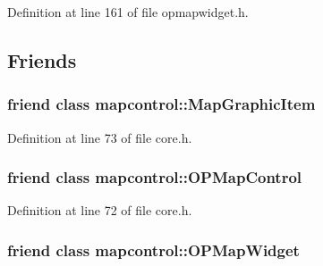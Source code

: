 \-Definition at line 161 of file opmapwidget.\-h.



\subsection{\-Friends}
\hypertarget{group___o_p_map_widget_ga4fb537bcd209fc77cf5b8c9e38360c07}{
\subsubsection[{mapcontrol\-::\-Map\-Graphic\-Item}]{\setlength{\rightskip}{0pt plus 5cm}friend class {\bf mapcontrol\-::\-Map\-Graphic\-Item}}}\label{group___o_p_map_widget_ga4fb537bcd209fc77cf5b8c9e38360c07}


\-Definition at line 73 of file core.\-h.

\hypertarget{group___o_p_map_widget_ga88abf786b489e97fc16ff6c07da3626e}{
\subsubsection[{mapcontrol\-::\-O\-P\-Map\-Control}]{\setlength{\rightskip}{0pt plus 5cm}friend class mapcontrol\-::\-O\-P\-Map\-Control}}\label{group___o_p_map_widget_ga88abf786b489e97fc16ff6c07da3626e}


\-Definition at line 72 of file core.\-h.

\hypertarget{group___o_p_map_widget_gaab6f3be35d4d41ee35530f402954d903}{
\subsubsection[{mapcontrol\-::\-O\-P\-Map\-Widget}]{\setlength{\rightskip}{0pt plus 5cm}friend class {\bf mapcontrol\-::\-O\-P\-Map\-Widget}}}\label{group___o_p_map_widget_gaab6f3be35d4d41ee35530f402954d903}


